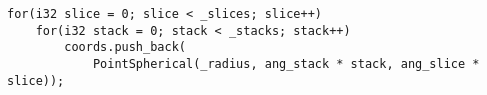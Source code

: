 \begin{lstlisting}
for(i32 slice = 0; slice < _slices; slice++)
    for(i32 stack = 0; stack < _stacks; stack++)
        coords.push_back(
            PointSpherical(_radius, ang_stack * stack, ang_slice * slice));
\end{lstlisting}
